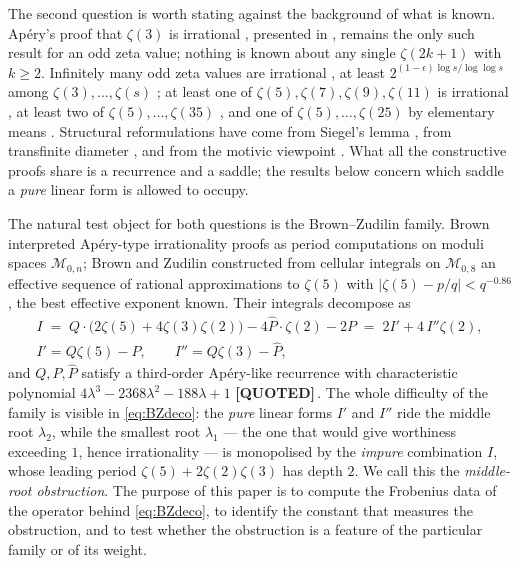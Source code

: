 \documentclass[11pt,reqno]{amsart}
\theoremstyle{plain}
\theoremstyle{definition}
\theoremstyle{remark}
\newcommand{\QUOTEDMARK}{{\normalfont\sffamily\bfseries[QUOTED]}}
\newcommand{\QUOTED}[1]{\QUOTEDMARK\,#1}
\newcommand{\Phat}{\widehat{P}}
\begin{document}
The second question is worth stating against the background of what is known. Ap\'ery's proof
that $\zeta(3)$ is irrational \cite{Ap79,Be79}, presented in \cite{Fi04}, remains the only such
result for an odd zeta value; nothing is known about any single $\zeta(2k+1)$ with $k\ge2$.
Infinitely many odd zeta values are irrational \cite{Riv,BR01}, at least
$2^{(1-\epsilon)\log s/\log\log s}$ among $\zeta(3),\dots,\zeta(s)$ \cite{FSZ}; at least one of
$\zeta(5),\zeta(7),\zeta(9),\zeta(11)$ is irrational \cite{Zu02a,Zu04}, at least two of
$\zeta(5),\dots,\zeta(35)$ \cite{LZ}, and one of $\zeta(5),\dots,\zeta(25)$ by elementary means
\cite{Zu18}. Structural reformulations have come from Siegel's lemma \cite{Fi21}, from
transfinite diameter \cite{Br26}, and from the motivic viewpoint \cite{Br16}. What all the
constructive proofs share is a recurrence and a saddle; the results below concern which saddle a
\emph{pure} linear form is allowed to occupy.

The natural test object for both questions is the Brown--Zudilin family. Brown \cite{Br16} interpreted
Ap\'ery-type irrationality proofs as period computations on moduli spaces $\mathcal M_{0,n}$;
Brown and Zudilin \cite{BZ} constructed from cellular integrals on $\mathcal M_{0,8}$ an
effective sequence of rational approximations to $\zeta(5)$ with $|\zeta(5)-p/q|<q^{-0.86}$,
the best effective exponent known. Their integrals decompose as
\begin{equation}\label{eq:BZdeco}
\begin{gathered}
  I \;=\; Q\cdot\bigl(2\zeta(5)+4\zeta(3)\zeta(2)\bigr)-4\Phat\cdot\zeta(2)-2P
  \;=\; 2I'+4\,I''\zeta(2),\\
  I'=Q\zeta(5)-P,\qquad I''=Q\zeta(3)-\Phat ,
\end{gathered}
\end{equation}
and $Q,P,\Phat$ satisfy a third-order Ap\'ery-like recurrence with characteristic polynomial
$4\lambda^3-2368\lambda^2-188\lambda+1$ \QUOTED{\cite[\S2]{BZ}}. The whole difficulty of the
family is visible in \eqref{eq:BZdeco}: the \emph{pure} linear forms $I'$ and $I''$ ride the
middle root $\lambda_2$, while the smallest root $\lambda_1$ --- the one that would give
worthiness exceeding $1$, hence irrationality --- is monopolised by the \emph{impure}
combination $I$, whose leading period $\zeta(5)+2\zeta(2)\zeta(3)$ has depth $2$. We call this
the \emph{middle-root obstruction}. The purpose of this paper is to compute the Frobenius data
of the operator behind \eqref{eq:BZdeco}, to identify the constant that measures the
obstruction, and to test whether the obstruction is a feature of the particular family or of
its weight.
\end{document}
